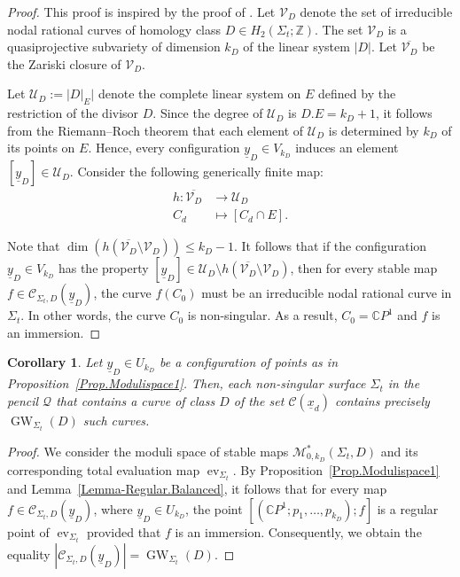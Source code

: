 \documentclass[10pt,a4paper]{article}
\numberwithin{equation}{section}
\theoremstyle{definition}
\theoremstyle{plain}
\newtheorem{corollary}[definition]{Corollary}
\theoremstyle{remark}
\newcommand{\Z}{\mathbb{Z}}
\newcommand{\C}{\mathbb{C}}
\DeclareMathOperator{\GW}{GW}
\DeclareMathOperator{\ev}{ev}
\newcommand{\lra}{\longrightarrow}
\begin{document}
 \begin{proof}
   This proof is inspired by the proof of \cite[Proposition~5.2]{brugalle2016pencils}.
   Let $\mathcal{V}_D$ denote the set of irreducible nodal rational curves of homology class $D\in H_2(\Sigma_t;\Z)$. The set $\mathcal{V}_D$ is a quasiprojective subvariety of dimension $k_D$ of the linear system $|D|$. 
    Let $\overline{\mathcal{V}_D}$ be the Zariski closure of $\mathcal{V}_D$.
    
   Let $\mathcal{U}_D:=|D|_E|$ denote the complete linear system on $E$ defined by the restriction of the divisor $D$. Since the degree of $\mathcal{U}_D$ is $D.E=k_D+1$, it follows from the Riemann--Roch theorem that each element of $\mathcal{U}_D$ is determined by $k_D$ of its points on $E$. Hence, every configuration $\underline{y}_D\in V_{k_D}$ induces an element $[ \underline{y}_D]\in \mathcal{U}_D$. Consider the following generically finite map:
   \begin{align*}
    h\colon \overline{\mathcal{V}_D} &\lra \mathcal{U}_D\\
    C_d&\longmapsto [C_d\cap E] .
\end{align*}

   Note that $\dim (h(\overline{\mathcal{V}_D}\setminus \mathcal{V}_D))\leq k_D-1$. It follows that if the configuration $\underline{y}_D\in V_{k_D}$ has the property $[{\underline{y}}_D] \in\mathcal{U}_D\setminus h(\overline{\mathcal{V}_D}\setminus \mathcal{V}_D)$, then 
    for every stable map $f\in \mathcal{C}_{\Sigma_t,D}(\underline{y}_D)$, the curve $f(C_0)$ must be an irreducible nodal rational curve in $\Sigma_t$. 
    In other words, the curve $C_0$ is non-singular. As a result, $C_0=\C P^1$ and $f$ is an immersion.
 \end{proof}
 
 \begin{corollary}\label{Corollary.Modulispace1}
 Let $\underline{y}_D\in U_{k_D}$ be a configuration of points as in Proposition~\ref{Prop.Modulispace1}. 
 Then, each non-singular surface $\Sigma_t$ in the pencil $\mathcal{Q}$ that contains a curve of class $D$ of the set $\mathcal{C}(\underline{x}_d)$  contains  precisely $\GW_{\Sigma_t}(D)$ such curves.
    \end{corollary}

 \begin{proof}
We consider the moduli space of stable maps $\mathcal{M}^*_{0,k_D}(\Sigma_t,D)$ and its corresponding total evaluation map $\ev_{\Sigma_t}$. By Proposition~\ref{Prop.Modulispace1} and Lemma~\ref{Lemma-Regular.Balanced}, it follows that for every map $f\in\mathcal{C}_{\Sigma_t,D}(\underline{y}_D)$, where $\underline{y}_D\in U_{k_D}$, the point $[(\C P^1;p_1,\ldots,p_{k_D});f]$ is a regular point of  $\ev_{\Sigma_t}$ provided that $f$ is an immersion. Consequently, we obtain the equality $|\mathcal{C}_{\Sigma_t,D}(\underline{y}_D)|=\GW_{\Sigma_t}(D)$.
 \end{proof}
 
\end{document}
